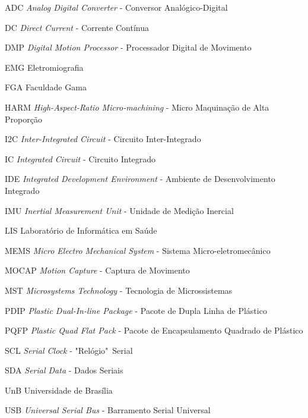 \begin{siglas}

   \item[ADC]	\textit{Analog Digital Converter} - Conversor Analógico-Digital					
   \item[DC]	\textit{Direct Current} - Corrente Contínua						
   \item[DMP]	\textit{Digital Motion Processor} -	Processador	Digital	de	Movimento			
   \item[EMG]	Eletromiografia										
   \item[FGA]	Faculdade Gama									
   \item[HARM]	\textit{High-Aspect-Ratio Micro-machining} - Micro Maquinação de Alta Proporção			
   \item[I2C]	\textit{Inter-Integrated Circuit} -	Circuito Inter-Integrado						
   \item[IC]	\textit{Integrated	Circuit} - Circuito	Integrado						
   \item[IDE]	\textit{Integrated	Development	Environment} - Ambiente	de Desenvolvimento Integrado			
   \item[IMU]	\textit{Inertial Measurement Unit} - Unidade de	Medição	Inercial			
   \item[LIS]	Laboratório	de Informática em Saúde						
   \item[MEMS]	\textit{Micro Electro Mechanical System} - Sistema Micro-eletromecânico				
   \item[MOCAP]	\textit{Motion Capture} - Captura	de Movimento					
   \item[MST]	\textit{Microsystems Technology} - Tecnologia de Microssistemas					
   \item[PDIP]	\textit{Plastic Dual-In-line Package} - Pacote de Dupla Linha de Plástico	
   \item[PQFP]	\textit{Plastic	Quad Flat Pack} - Pacote de	Encapsulamento Quadrado de Plástico
   \item[SCL]	\textit{Serial Clock} -	"Relógio"\ Serial						
   \item[SDA]	\textit{Serial Data} - Dados Seriais						
   \item[UnB]	Universidade de	Brasília								
   \item[USB]	\textit{Universal Serial Bus} -	Barramento Serial Universal				
   
\end{siglas}
